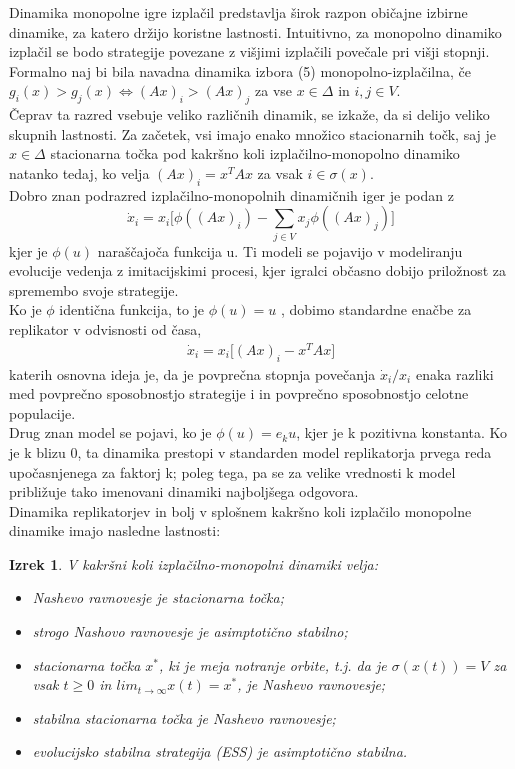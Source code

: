 \documentclass[a4paper]{article}
\newtheorem{theorem}{Izrek}
\begin{document}
Dinamika monopolne igre izplačil predstavlja širok razpon običajne izbirne dinamike, za katero držijo koristne lastnosti. Intuitivno, za monopolno dinamiko izplačil se bodo strategije povezane z višjimi izplačili povečale pri višji stopnji. Formalno naj bi bila navadna dinamika izbora (5) monopolno-izplačilna, če $g_i(x)>g_j(x) \Leftrightarrow (Ax)_i>(Ax)_j$ za vse $x\in\Delta$ in $i, j \in V$.\\
Čeprav ta razred vsebuje veliko različnih dinamik, se izkaže, da si delijo veliko skupnih lastnosti. Za začetek, vsi imajo enako množico stacionarnih točk, saj je $x\in\Delta$ stacionarna točka pod kakršno koli izplačilno-monopolno dinamiko natanko tedaj, ko velja $(Ax)_i = x^T A x$ za vsak $i \in\sigma(x)$.\\
Dobro znan podrazred izplačilno-monopolnih dinamičnih iger je podan z
$$\dot{x}_i=x_i\lbrack\phi((Ax)_i)-\sum_{j\in V}x_j\phi((Ax)_j)\rbrack$$
kjer je $\phi(u)$ naraščajoča funkcija u. Ti modeli se pojavijo v modeliranju evolucije vedenja z imitacijskimi procesi, kjer igralci občasno dobijo priložnost za spremembo svoje strategije.\\
Ko je $\phi$ identična funkcija, to je $\phi(u)=u$ , dobimo standardne enačbe za replikator v odvisnosti od časa,
\begin{gather}
\dot{x}_i=x_i\lbrack(Ax)_i-x^TAx\rbrack
\end{gather}
katerih osnovna ideja je, da je povprečna stopnja povečanja $\dot{x}_i/x_i$ enaka razliki med povprečno sposobnostjo strategije i in povprečno sposobnostjo celotne populacije.\\
Drug znan model se pojavi, ko je $\phi(u) = e_ku$, kjer je k pozitivna konstanta. Ko je k blizu 0, ta dinamika prestopi v standarden model replikatorja prvega reda upočasnjenega za faktorj k; poleg tega, pa se za velike vrednosti k model približuje tako imenovani dinamiki najboljšega odgovora. \\
Dinamika replikatorjev in bolj v splošnem kakršno koli izplačilo monopolne dinamike imajo nasledne lastnosti:
\begin{theorem}
V kakršni koli izplačilno-monopolni dinamiki velja:
\begin{itemize}
\item Nashevo ravnovesje je stacionarna točka;
\item strogo Nashovo ravnovesje je asimptotično stabilno;
\item stacionarna točka $x^*$, ki je meja notranje orbite, t.j.
da je $\sigma(x(t)) = V$ za vsak $t \geq 0$ in $lim_{t\rightarrow\infty} x(t) = x^*$, je Nashevo ravnovesje;
\item stabilna stacionarna točka je Nashevo ravnovesje;
\item evolucijsko stabilna strategija (ESS) je asimptotično stabilna.
\end{itemize}
\end{theorem}
\end{document}
